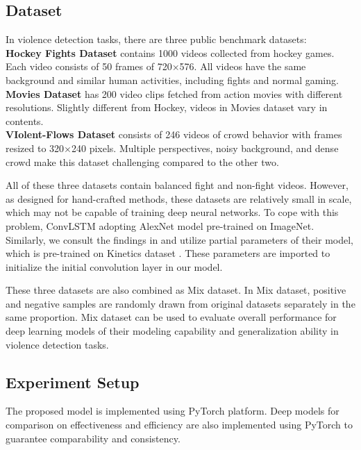 \documentclass[10pt,twocolumn,letterpaper]{article}
\begin{document}
\subsection{Dataset}

In violence detection tasks, there are three public benchmark datasets: \\
\textbf{Hockey Fights Dataset} \cite{hockey} contains 1000 videos collected from hockey games.
Each video consists of 50 frames of 720$\times$576. 
All videos have the same background and similar human activities, including fights and normal gaming. \\
\textbf{Movies Dataset} \cite{hockey} has 200 video clips fetched from action movies with different resolutions. Slightly different from Hockey, videos in Movies dataset vary in contents.\\
\textbf{VIolent-Flows Dataset} \cite{vif} consists of 246 videos of crowd behavior with frames resized to 320$\times$240 pixels.
Multiple perspectives, noisy background, and dense crowd make this dataset challenging compared to the other two.

All of these three datasets contain balanced fight and non-fight videos. 
However, as designed for hand-crafted methods, these datasets are relatively small in scale, which may not be capable of training deep neural networks.
To cope with this problem, ConvLSTM \cite{convlstm_sudh} adopting AlexNet model pre-trained on ImageNet.
Similarly, we consult the findings in \cite{3dcnn_2} and utilize partial parameters of their model, which is pre-trained on Kinetics dataset \cite{kinetics}.
These parameters are imported to initialize the initial convolution layer in our model.

These three datasets are also combined as Mix dataset.
In Mix dataset, positive and negative samples are randomly drawn from original datasets separately in the same proportion.
Mix dataset can be used to evaluate overall performance for deep learning models of their modeling capability and generalization ability in violence detection tasks.

\subsection{Experiment Setup}

The proposed model is implemented using PyTorch \cite{pytorch} platform. 
Deep models for comparison on effectiveness and efficiency are also implemented using PyTorch to guarantee comparability and consistency.
\end{document}
